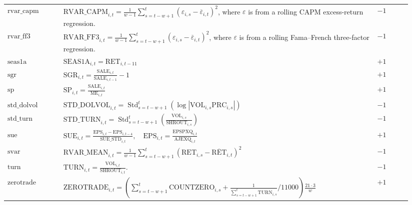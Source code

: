 \documentclass[11pt]{article}
\begin{document}
\begin{landscape}
\begin{longtable}{p{0.13\linewidth}p{0.73\linewidth}p{0.08\linewidth}}
\(\mathrm{rvar\_capm}\) &
\(\displaystyle \mathrm{RVAR\_CAPM}_{i,t}=\frac{1}{w-1}\sum_{s=t-w+1}^{t}(\varepsilon_{i,s}-\overline{\varepsilon}_{i,t})^2\),
where \(\varepsilon\) is from a rolling CAPM excess-return regression.  & \(-1\)\\

\(\mathrm{rvar\_ff3}\) &
\(\displaystyle \mathrm{RVAR\_FF3}_{i,t}=\frac{1}{w-1}\sum_{s=t-w+1}^{t}(\varepsilon_{i,s}-\overline{\varepsilon}_{i,t})^2\),
where \(\varepsilon\) is from a rolling Fama--French three-factor regression.  & \(-1\)\\

\(\mathrm{seas1a}\) &
\(\displaystyle \mathrm{SEAS1A}_{i,t}=\mathrm{RET}_{i,t-11}\)  & \(+1\)\\

\(\mathrm{sgr}\) &
\(\displaystyle \mathrm{SGR}_{i,t}=\frac{\mathrm{SALE}_{i,t}}{\mathrm{SALE}_{i,t-1}}-1\)  & \(+1\)\\

\(\mathrm{sp}\) &
\(\displaystyle \mathrm{SP}_{i,t}=\frac{\mathrm{SALE}_{i,t}}{\mathrm{ME}_{i,t}}\)  & \(+1\)\\

\(\mathrm{std\_dolvol}\) &
\(\displaystyle \mathrm{STD\_DOLVOL}_{i,t}=\operatorname{Std}_{s=t-w+1}^{t}
\left(\log|\mathrm{VOL}_{i,s}\mathrm{PRC}_{i,s}|\right)\)  & \(-1\)\\

\(\mathrm{std\_turn}\) &
\(\displaystyle \mathrm{STD\_TURN}_{i,t}=\operatorname{Std}_{s=t-w+1}^{t}
\left(\frac{\mathrm{VOL}_{i,s}}{\mathrm{SHROUT}_{i,s}}\right)\)  & \(-1\)\\

\(\mathrm{sue}\) &
\(\displaystyle \mathrm{SUE}_{i,t}=\frac{\mathrm{EPS}_{i,t}-\mathrm{EPS}_{i,t-4}}{\mathrm{SUE\_STD}_{i,t}},\quad
\mathrm{EPS}_{i,t}=\frac{\mathrm{EPSPXQ}_{i,t}}{\mathrm{AJEXQ}_{i,t}}\)  & \(+1\)\\

\(\mathrm{svar}\) &
\(\displaystyle \mathrm{RVAR\_MEAN}_{i,t}=\frac{1}{w-1}\sum_{s=t-w+1}^{t}
(\mathrm{RET}_{i,s}-\overline{\mathrm{RET}}_{i,t})^2\)  & \(-1\)\\

\(\mathrm{turn}\) &
\(\displaystyle \mathrm{TURN}_{i,t}=\frac{\mathrm{VOL}_{i,t}}{\mathrm{SHROUT}_{i,t}}\).  & \(-1\)\\

\(\mathrm{zerotrade}\) &
\(\displaystyle \mathrm{ZEROTRADE}_{i,t}=
\left(\sum_{s=t-w+1}^{t}\mathrm{COUNTZERO}_{i,s}+
\frac{1}{\sum_{s=t-w+1}^{t}\mathrm{TURN}_{i,s}}/11000\right)
\frac{21\cdot 3}{w}\)  & \(+1\)\\

\end{longtable}
\end{landscape}
\end{document}
